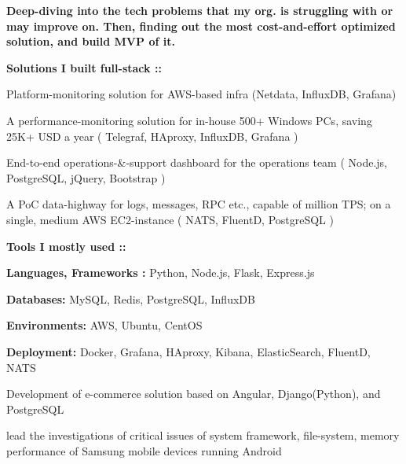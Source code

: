 \documentclass[]{deedy-resume-openfont}
\begin{document}

\textbf{Deep-diving into the tech problems that my org. is struggling with or may improve on. Then, finding out the most cost-and-effort optimized solution, and build MVP of it.}

\textbf{{Solutions I built full-stack ::}}
\begin{tightemize}
\item Platform-monitoring solution for AWS-based infra (Netdata, InfluxDB, Grafana)
\item A performance-monitoring solution for in-house 500+ Windows PCs, saving 25K+ USD a year ( Telegraf, HAproxy, InfluxDB, Grafana )
\item End-to-end operations-\&-support dashboard for the operations team ( Node.js, PostgreSQL, jQuery, Bootstrap )
\item A PoC data-highway for logs, messages, RPC etc., capable of million TPS; on a single, medium AWS EC2-instance ( NATS, FluentD, PostgreSQL )
 
\end{tightemize}
\smallskip

\textbf{Tools I mostly used ::}

\begin{tightemize}
\item \textbf{Languages, Frameworks :}   Python, Node.js, Flask, Express.js
\item \textbf{Databases:}    MySQL, Redis, PostgreSQL, InfluxDB 
\item \textbf{Environments:}   AWS, Ubuntu, CentOS
\item \textbf{Deployment:} Docker, Grafana, HAproxy, Kibana, ElasticSearch, FluentD, NATS
\end{tightemize}
\sectionsep

\begin{tightemize}
\item Development of e-commerce solution based on Angular, Django(Python), and PostgreSQL
\end{tightemize}
\sectionsep

\begin{tightemize}
\item lead the investigations of critical issues of system framework, file-system, memory performance of Samsung mobile devices running Android
\end{tightemize}
\sectionsep
\end{document}
